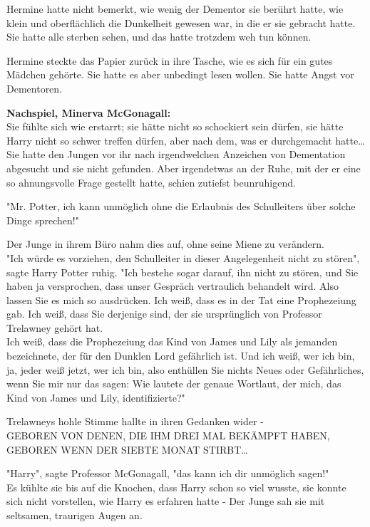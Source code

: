 {Hermine hatte nicht bemerkt, wie wenig der Dementor sie berührt hatte, wie klein und oberflächlich die Dunkelheit gewesen war, in die er sie gebracht hatte. Sie hatte alle sterben sehen, und das hatte trotzdem weh tun können.

Hermine steckte das Papier zurück in ihre Tasche, wie es sich für ein gutes Mädchen gehörte. Sie hatte es aber unbedingt lesen wollen. Sie hatte Angst vor Dementoren.

\textbf{Nachspiel, Minerva McGonagall:}\\ Sie fühlte sich wie erstarrt; sie hätte nicht so schockiert sein dürfen, sie hätte Harry nicht so schwer treffen dürfen, aber nach dem, was er durchgemacht hatte… Sie hatte den Jungen vor ihr nach irgendwelchen Anzeichen von Dementation abgesucht und sie nicht gefunden. Aber irgendetwas an der Ruhe, mit der er eine so ahnungsvolle Frage gestellt hatte, schien zutiefst beunruhigend.

"Mr. Potter, ich kann unmöglich ohne die Erlaubnis des Schulleiters über solche Dinge sprechen!"

Der Junge in ihrem Büro nahm dies auf, ohne seine Miene zu verändern.\\ "Ich würde es vorziehen, den Schulleiter in dieser Angelegenheit nicht zu stören", sagte Harry Potter ruhig. "Ich bestehe sogar darauf, ihn nicht zu stören, und Sie haben ja versprochen, dass unser Gespräch vertraulich behandelt wird. Also lassen Sie es mich so ausdrücken. Ich weiß, dass es in der Tat eine Prophezeiung gab. Ich weiß, dass Sie derjenige sind, der sie ursprünglich von Professor Trelawney gehört hat.\\ Ich weiß, dass die Prophezeiung das Kind von James und Lily als jemanden bezeichnete, der für den Dunklen Lord gefährlich ist. Und ich weiß, wer ich bin, ja, jeder weiß jetzt, wer ich bin, also enthüllen Sie nichts Neues oder Gefährliches, wenn Sie mir nur das sagen: Wie lautete der genaue Wortlaut, der mich, das Kind von James und Lily, identifizierte?"

Trelawneys hohle Stimme hallte in ihren Gedanken wider -\\

GEBOREN VON DENEN, DIE IHM DREI MAL BEKÄMPFT HABEN, GEBOREN WENN DER SIEBTE MONAT STIRBT…

"Harry", sagte Professor McGonagall, "das kann ich dir unmöglich sagen!"\\ Es kühlte sie bis auf die Knochen, dass Harry schon so viel wusste, sie konnte sich nicht vorstellen, wie Harry es erfahren hatte - Der Junge sah sie mit seltsamen, traurigen Augen an.

}

